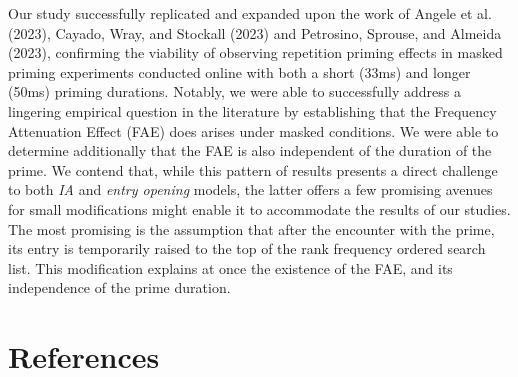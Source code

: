 \documentclass[
]{interact}
\begin{document}
Our study successfully replicated and expanded upon the work of Angele
et al. (2023), Cayado, Wray, and Stockall (2023) and Petrosino, Sprouse,
and Almeida (2023), confirming the viability of observing repetition
priming effects in masked priming experiments conducted online with both
a short (33ms) and longer (50ms) priming durations. Notably, we were
able to successfully address a lingering empirical question in the
literature by establishing that the Frequency Attenuation Effect (FAE)
does arises under masked conditions. We were able to determine
additionally that the FAE is also independent of the duration of the
prime. We contend that, while this pattern of results presents a direct
challenge to both \emph{IA} and \emph{entry opening} models, the latter
offers a few promising avenues for small modifications might enable it
to accommodate the results of our studies. The most promising is the
assumption that after the encounter with the prime, its entry is
temporarily raised to the top of the rank frequency ordered search list.
This modification explains at once the existence of the FAE, and its
independence of the prime duration.

\newpage{}

\section*{References}\label{references}
\end{document}
